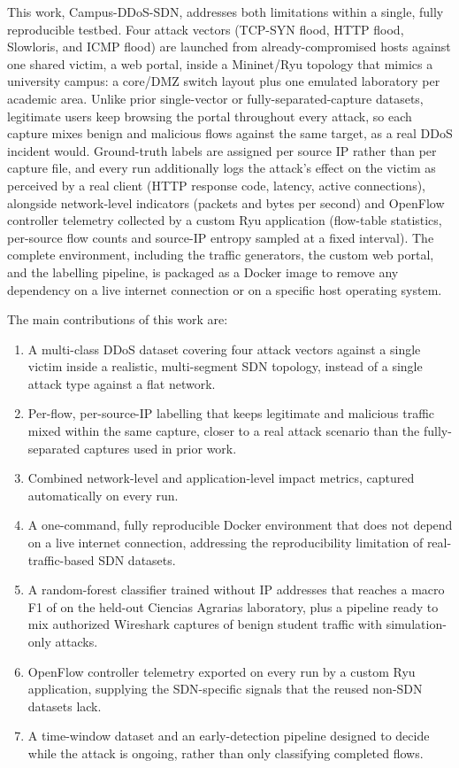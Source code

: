\documentclass[journal,article,submit,moreauthors]{Definitions/mdpi}
\begin{document}
This work, Campus-DDoS-SDN, addresses both limitations within a single, fully reproducible testbed. Four attack vectors (TCP-SYN flood, HTTP flood, Slowloris, and ICMP flood) are launched from already-compromised hosts against one shared victim, a web portal, inside a Mininet/Ryu topology that mimics a university campus: a core/DMZ switch layout plus one emulated laboratory per academic area. Unlike prior single-vector or fully-separated-capture datasets, legitimate users keep browsing the portal throughout every attack, so each capture mixes benign and malicious flows against the same target, as a real DDoS incident would. Ground-truth labels are assigned per source IP rather than per capture file, and every run additionally logs the attack's effect on the victim as perceived by a real client (HTTP response code, latency, active connections), alongside network-level indicators (packets and bytes per second) and OpenFlow controller telemetry collected by a custom Ryu application (flow-table statistics, per-source flow counts and source-IP entropy sampled at a fixed interval). The complete environment, including the traffic generators, the custom web portal, and the labelling pipeline, is packaged as a Docker image to remove any dependency on a live internet connection or on a specific host operating system.

The main contributions of this work are:
\begin{enumerate}[label=\roman*.]
  \item A multi-class DDoS dataset covering four attack vectors against a single victim inside a realistic, multi-segment SDN topology, instead of a single attack type against a flat network.
  \item Per-flow, per-source-IP labelling that keeps legitimate and malicious traffic mixed within the same capture, closer to a real attack scenario than the fully-separated captures used in prior work.
  \item Combined network-level and application-level impact metrics, captured automatically on every run.
  \item A one-command, fully reproducible Docker environment that does not depend on a live internet connection, addressing the reproducibility limitation of real-traffic-based SDN datasets.
  \item A random-forest classifier trained without IP addresses that reaches a macro F1 of \Fmacro on the held-out Ciencias Agrarias laboratory, plus a pipeline ready to mix authorized Wireshark captures of benign student traffic with simulation-only attacks.
  \item OpenFlow controller telemetry exported on every run by a custom Ryu application, supplying the SDN-specific signals that the reused non-SDN datasets lack.
  \item A time-window dataset and an early-detection pipeline designed to decide while the attack is ongoing, rather than only classifying completed flows.
\end{enumerate}
\end{document}
